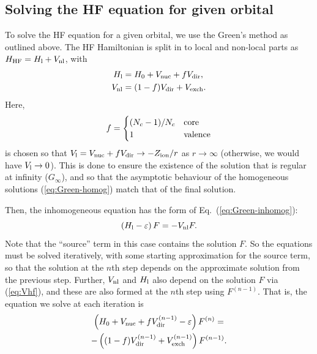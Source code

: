\documentclass[10pt,twocolumn,a4paper]{article}%
\newcommand{\be}{\begin{equation}}
\newcommand{\ee}{\end{equation}}
\def\en{\ensuremath{\varepsilon}}
\begin{document}
\subsection{Solving the HF equation for given orbital}\label{sec:hf-orbital}

To solve the HF equation for a given orbital, we use the Green's method as outlined above.
The HF Hamiltonian is
split in to local and non-local parts as $H_{\rm HF} = H_{\rm l}+V_{\rm nl}$, with
\begin{align}
H_{\rm l} &= H_0 + V_{\rm nuc}+fV_{\rm dir},\\
V_{\rm nl} &= (1-f)V_{\rm dir}+V_{\rm exch}.
\end{align}
Here,
\be
f=
\begin{cases}
(N_c - 1)/N_c & {\rm core} \\
 1 & {\rm valence}
\end{cases}
\ee
is chosen so that $V_{\rm l} = V_{\rm nuc} +f V_{\rm dir}\to -Z_{\rm ion}/r$ as $r\to\infty$ (otherwise, we would have $V_{\rm l}\to0$).
This is done to ensure the existence of the solution that is regular at infinity ($G_\infty$), and so that the asymptotic behaviour of the homogeneous solutions (\ref{eq:Green-homog})  match that of the final solution.


Then, the inhomogeneous equation has the form of Eq.~(\ref{eq:Green-inhomog}):
\be
\left( H_{\rm l}- \en\right)F = -V_{\rm nl}F.
\ee
Note that the ``source'' term in this case contains the solution $F$. 
So the equations must be solved iteratively, with some starting approximation for the source term, so that the solution at the $n$th step depends on the approximate solution from the previous step.
Further, $V_{\rm nl}$ and $H_{\rm l}$ also depend on the solution $F$ via (\ref{eq:Vhf}), and these are also formed at the $n$th step using $F^{(n-1)}$.
That is, the equation we solve at each iteration is
\begin{multline}\label{eq:inhomog-HF}
\left( H_0 + V_{\rm nuc} + fV_{\rm dir}^{(n-1)} - \en\right)F^{(n)} =
\\
 -\left( (1-f)V_{\rm dir}^{(n-1)}+V_{\rm exch}^{(n-1)} \right)F^{(n-1)}.
\end{multline}
\end{document}
